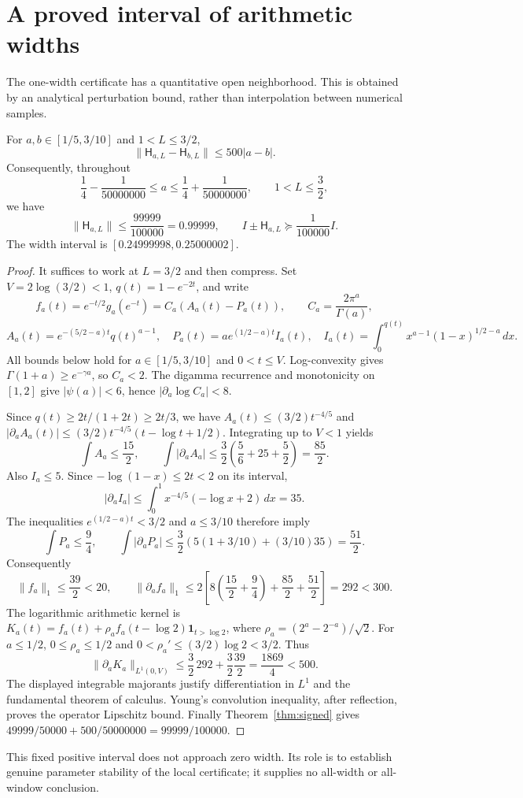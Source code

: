 \section{A proved interval of arithmetic widths}
The one-width certificate has a quantitative open neighborhood. This is obtained by an analytical perturbation bound, rather than interpolation between numerical samples.

\begin{proposition}\label{prop:widthlipschitz}
For $a,b\in[1/5,3/10]$ and $1<L\leq3/2$,
\[
 \|\mathsf H_{a,L}-\mathsf H_{b,L}\|\leq500|a-b|.
\]
Consequently, throughout
\[
 \frac14-\frac1{50000000}\leq a\leq\frac14+\frac1{50000000},
 \qquad 1<L\leq\frac32,
\]
we have
\[
 \|\mathsf H_{a,L}\|\leq\frac{99999}{100000}=0.99999,
 \qquad I\pm\mathsf H_{a,L}\succeq\frac1{100000}I.
\]
The width interval is $[0.24999998,0.25000002]$.
\end{proposition}
\begin{proof}
It suffices to work at $L=3/2$ and then compress. Set $V=2\log(3/2)<1$, $q(t)=1-e^{-2t}$, and write
\[
 f_a(t)=e^{-t/2}g_a(e^{-t})=C_a(A_a(t)-P_a(t)),\qquad
 C_a=\frac{2\pi^a}{\Gamma(a)},
\]
\[
 A_a(t)=e^{-(5/2-a)t}q(t)^{a-1},\quad
 P_a(t)=ae^{(1/2-a)t}I_a(t),\quad
 I_a(t)=\int_0^{q(t)}x^{a-1}(1-x)^{1/2-a}\,dx.
\]
All bounds below hold for $a\in[1/5,3/10]$ and $0<t\leq V$. Log-convexity gives $\Gamma(1+a)\geq e^{-\gamma a}$, so $C_a<2$. The digamma recurrence and monotonicity on $[1,2]$ give $|\psi(a)|<6$, hence $|\partial_a\log C_a|<8$.

Since $q(t)\geq2t/(1+2t)\geq2t/3$, we have $A_a(t)\leq(3/2)t^{-4/5}$ and
$|\partial_a A_a(t)|\leq(3/2)t^{-4/5}(t-\log t+1/2)$. Integrating up to $V<1$ yields
\[
 \int A_a\leq\frac{15}{2},\qquad
 \int|\partial_a A_a|\leq\frac32\left(\frac56+25+\frac52\right)=\frac{85}{2}.
\]
Also $I_a\leq5$. Since $-\log(1-x)\leq2t<2$ on its interval,
\[
 |\partial_a I_a|\leq\int_0^1x^{-4/5}(-\log x+2)\,dx=35.
\]
The inequalities $e^{(1/2-a)t}<3/2$ and $a\leq3/10$ therefore imply
\[
 \int P_a\leq\frac94,\qquad
 \int|\partial_aP_a|\leq\frac32\left(5(1+3/10)+(3/10)35\right)=\frac{51}{2}.
\]
Consequently
\[
 \|f_a\|_1\leq\frac{39}{2}<20,\qquad
 \|\partial_af_a\|_1\leq2\left[8\left(\frac{15}{2}+\frac94\right)+\frac{85}{2}+\frac{51}{2}\right]=292<300.
\]
The logarithmic arithmetic kernel is
$K_a(t)=f_a(t)+\rho_a f_a(t-\log2)\mathbf1_{t>\log2}$,
where $\rho_a=(2^a-2^{-a})/\sqrt2$. For $a\leq1/2$,
$0\leq\rho_a\leq1/2$ and $0<\rho_a'\leq(3/2)\log2<3/2$.
Thus
\[
 \|\partial_aK_a\|_{L^1(0,V)}
 \leq\frac32\,292+\frac32\frac{39}{2}
 =\frac{1869}{4}<500.
\]
The displayed integrable majorants justify differentiation in $L^1$ and the fundamental theorem of calculus. Young's convolution inequality, after reflection, proves the operator Lipschitz bound. Finally Theorem~\ref{thm:signed} gives
$49999/50000+500/50000000=99999/100000$.
\end{proof}
This fixed positive interval does not approach zero width. Its role is to establish genuine parameter stability of the local certificate; it supplies no all-width or all-window conclusion.
